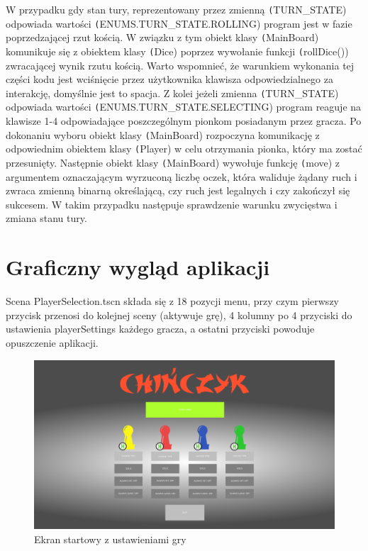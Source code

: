 \documentclass[conference]{IEEEtran}
\begin{document}
W przypadku gdy stan tury, reprezentowany przez zmienną \texttt(TURN\_STATE) odpowiada wartości \texttt(ENUMS.TURN\_STATE.ROLLING) program jest w fazie poprzedzającej rzut kością. W związku z tym obiekt klasy \texttt(MainBoard) komunikuje się z obiektem klasy \texttt(Dice) poprzez wywołanie funkcji \texttt(rollDice()) zwracającej wynik rzutu kością. Warto wspomnieć, że warunkiem wykonania tej części kodu jest wciśnięcie przez użytkownika klawisza odpowiedzialnego za interakcję, domyślnie jest to spacja. Z kolei jeżeli zmienna \texttt(TURN\_STATE) odpowiada wartości \texttt(ENUMS.TURN\_STATE.SELECTING) program reaguje na klawisze 1-4 odpowiadające poszczególnym pionkom posiadanym przez gracza. Po dokonaniu wyboru obiekt klasy \texttt(MainBoard) rozpoczyna komunikację z odpowiednim obiektem klasy \texttt(Player) w celu otrzymania pionka, który ma zostać przesunięty. Następnie obiekt klasy \texttt(MainBoard) wywołuje funkcję \texttt(move) z argumentem oznaczającym wyrzuconą liczbę oczek, która waliduje żądany ruch i zwraca zmienną binarną określającą, czy ruch jest legalnych i czy zakończył się sukcesem. W takim przypadku następuje sprawdzenie warunku zwycięstwa i zmiana stanu tury.

\section{Graficzny wygląd aplikacji}
Scena PlayerSelection.tscn składa się z 18 pozycji menu, przy czym pierwszy przycisk przenosi do kolejnej sceny (aktywuje grę), 4 kolumny po 4 przyciski do ustawienia playerSettings każdego gracza, a ostatni przyciski powoduje opuszczenie aplikacji.

\begin{figure}[H]
    \centering
    \includegraphics[width=\linewidth]{Scene_1.png}
    \caption{Ekran startowy z ustawieniami gry}
\end{figure}
\end{document}
